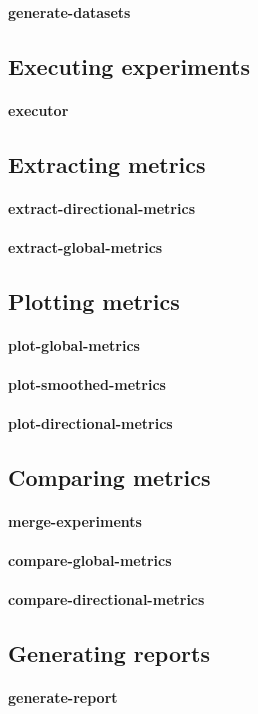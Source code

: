 \paragraph{generate-datasets}

\subsection{Executing experiments}

\paragraph{executor}

\subsection{Extracting metrics}

\paragraph{extract-directional-metrics}
\paragraph{extract-global-metrics}

\subsection{Plotting metrics}

\paragraph{plot-global-metrics}
\paragraph{plot-smoothed-metrics}
\paragraph{plot-directional-metrics}

\subsection{Comparing metrics}

\paragraph{merge-experiments}

\paragraph{compare-global-metrics}
\paragraph{compare-directional-metrics}

\subsection{Generating reports}

\paragraph{generate-report}
